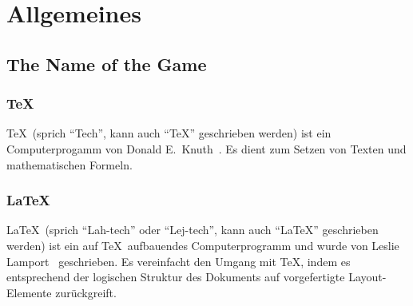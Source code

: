 \section{Allgemeines}
\label{sec:allgemeines}
 
\subsection{The Name of the Game}
 
\subsubsection{\TeX}

\TeX\ (sprich "`Tech"', kann auch "`TeX"' geschrieben werden) ist
ein Computerprogamm von Donald E.~Knuth~\cite{texbook,schwarz}.
Es dient zum Setzen 
von Texten und mathematischen Formeln.
 
\subsubsection{\LaTeX}
 
\LaTeX\ (sprich "`Lah-tech"' oder "`Lej-tech"', kann auch
"`LaTeX"' geschrieben werden) ist ein auf \TeX\ auf\/bauendes 
Computerprogramm und wurde von Leslie Lamport~\cite{manual,wonne} 
geschrieben.  Es vereinfacht den Umgang mit \TeX, indem es 
entsprechend der logischen Struktur des Dokuments auf vorgefertigte
Layout-Elemente zurückgreift.




